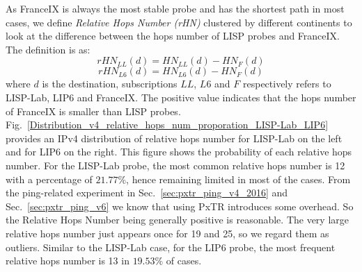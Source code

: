 As FranceIX is always the most stable probe and has the shortest path in most cases, we define \emph{Relative Hops Number (rHN)} clustered by different continents to look at the difference between the hops number of LISP probes and FranceIX. The definition is as: %
\begin{equation}
    \label{rHN_ll_2016}
    rHN_{LL}(d)=HN_{LL}(d) - HN_{F}(d) 
\end{equation}
\begin{equation}
    \label{rHN_l6_2016}
    rHN_{L6}(d)=HN_{L6}(d) - HN_{F}(d) 
\end{equation}
where $d$ is the destination, subscriptions $LL$, $L6$ and $F$ respectively refers to LISP-Lab, LIP6 and FranceIX. The positive value indicates that the hops number of FranceIX is smaller than LISP probes. Fig.~\ref{Distribution_v4_relative_hops_num_proporation_LISP-Lab_LIP6} provides an IPv4 distribution of relative hops number for LISP-Lab on the left and for LIP6 on the right. This figure shows the probability of each relative hops number. For the LISP-Lab probe, the most common relative hops number is 12 with a percentage of $21.77\%$, hence remaining limited in most of the cases. From the ping-related experiment in Sec.~\ref{sec:pxtr_ping_v4_2016} and Sec.~\ref{sec:pxtr_ping_v6} we know that using PxTR introduces some overhead. So the Relative Hops Number being generally positive is reasonable. The very large relative hops number just appears once for 19 and 25, so we regard them as outliers. Similar to the LISP-Lab case, for the LIP6 probe, the most frequent relative hops number is 13 in $19.53\%$ of cases.

